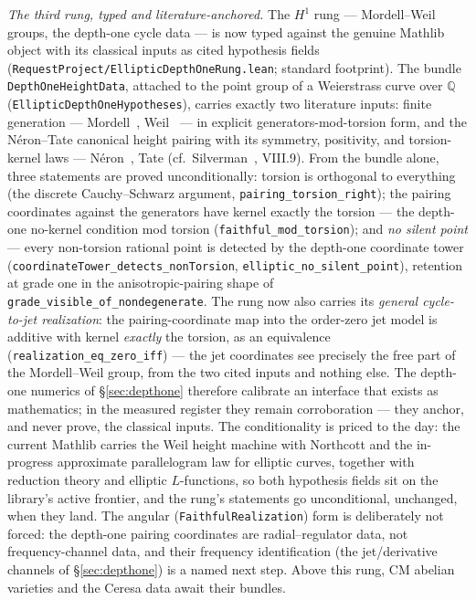 \documentclass[11pt]{article}
\theoremstyle{definition}
\theoremstyle{remark}
\begin{document}
\emph{The third rung, typed and literature-anchored.} The $H^1$ rung ---
Mordell--Weil groups, the depth-one cycle data --- is now typed against the
genuine Mathlib object with its classical inputs as cited hypothesis fields
(\texttt{RequestProject/EllipticDepthOneRung.lean}; standard footprint). The
bundle \texttt{DepthOneHeightData}, attached to the point group of a
Weierstrass curve over $\mathbb Q$ (\texttt{EllipticDepthOneHypotheses}),
carries exactly two literature inputs: finite generation ---
Mordell~\cite{Mordell1922}, Weil~\cite{Weil1929} --- in explicit
generators-mod-torsion form, and the N\'eron--Tate canonical height pairing
with its symmetry, positivity, and torsion-kernel laws ---
N\'eron~\cite{Neron1965}, Tate (cf.\ Silverman~\cite{Silverman}, VIII.9).
From the bundle alone, three statements are proved unconditionally: torsion is
orthogonal to everything (the discrete Cauchy--Schwarz argument,
\texttt{pairing\_torsion\_right}); the pairing coordinates against the
generators have kernel exactly the torsion --- the depth-one no-kernel
condition mod torsion (\texttt{faithful\_mod\_torsion}); and \emph{no silent
point} --- every non-torsion rational point is detected by the depth-one
coordinate tower (\texttt{coordinateTower\_detects\_nonTorsion},
\texttt{elliptic\_no\_silent\_point}), retention at grade one in the
anisotropic-pairing shape of \texttt{grade\_visible\_of\_nondegenerate}. The
rung now also carries its \emph{general cycle-to-jet realization}: the
pairing-coordinate map into the order-zero jet model is additive with kernel
\emph{exactly} the torsion, as an equivalence
(\texttt{realization\_eq\_zero\_iff}) --- the jet coordinates see precisely
the free part of the Mordell--Weil group, from the two cited inputs and
nothing else. The depth-one numerics of \S\ref{sec:depthone} therefore
calibrate an interface that exists as mathematics; in the measured register
they remain corroboration --- they anchor, and never prove, the classical
inputs. The
conditionality is priced to the day: the current Mathlib carries the Weil
height machine with Northcott and the in-progress approximate parallelogram
law for elliptic curves, together with reduction theory and elliptic
$L$-functions, so both hypothesis fields sit on the library's active frontier,
and the rung's statements go unconditional, unchanged, when they land. The
angular (\texttt{FaithfulRealization}) form is deliberately not forced: the
depth-one pairing coordinates are radial--regulator data, not
frequency-channel data, and their frequency identification (the
jet/derivative channels of \S\ref{sec:depthone}) is a named next step. Above
this rung, CM abelian varieties and the Ceresa data await their bundles.
\end{document}
